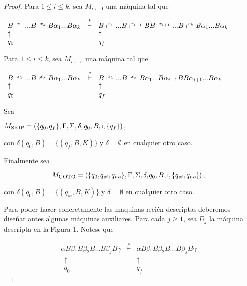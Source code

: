 \begin{lemma}
\begin{proof}
		\bigskip

    \noindent Para $1\leq i\leq k$, sea $M_{i\leftarrow 0}$ una máquina tal que

		\bigskip

    $\displaystyle \begin{array}{lcl} B\shortmid ^{x_{1}}...B\shortmid ^{x_{k}}B\alpha _{1}...B\alpha _{k} &
    \overset{\ast }{\vdash } & B\shortmid ^{x_{1}}...B\shortmid ^{x_{i-1}}BB\shortmid ^{x_{i+1}}...B\shortmid
    ^{x_{k}}B\alpha _{1}...B\alpha _{k} \\ \uparrow & & \uparrow \\ q_{0} & & q_{f} \end{array} $

		\bigskip

    \noindent Para $1\leq i\leq k$, sea $M_{i\leftarrow \varepsilon }$ una máquina tal que

		\bigskip

    $\displaystyle \begin{array}{lcl} B\shortmid ^{x_{1}}...B\shortmid ^{x_{k}}B\alpha _{1}...B\alpha _{k} &
    \overset{\ast }{\vdash } & B\shortmid ^{x_{1}}...B\shortmid
    ^{x_{k}}B\alpha _{1}...B\alpha _{i-1}BB\alpha _{i+1}...B\alpha _{k} \\
    \uparrow & & \uparrow \\ q_{0} & & q_{f} \end{array} $

		\bigskip

    \noindent Sea

    $\displaystyle M_{\mathrm{SKIP}}=\left( \{q_{0},q_{f}\},\Gamma ,\Sigma ,\delta ,q_{0},B,\shortmid ,\{q_{f}\}\right) ,$

		\noindent con $\delta (q_{0},B)=\{(q_{f},B,K)\}$ y $\delta =\emptyset $ en cualquier otro caso.

		\bigskip

    \noindent Finalmente sea

		\[
    \displaystyle M_{\mathrm{GOTO}}=\left( \{q_{0},q_{si},q_{no}\},\Gamma ,\Sigma ,\delta ,q_{0},B,\shortmid ,\{q_{si},q_{no}\}\right) ,
    \]

    \noindent con $\delta (q_{0},B)=\{(q_{si},B,K)\}$ y $\delta =\emptyset $ en cualquier otro caso.

		Para poder hacer concretamente las maquinas recién descriptas deberemos diseñar antes algunas máquinas auxiliares.
		Para cada $j\geq 1$, sea $D_{j}$ la máquina descripta en la Figura 1. Notese que

		\[
		\displaystyle \begin{array}{lcr} \alpha B\beta _{1}B\beta _{2}B...B\beta _{j}B\gamma & \overset{\ast }{\vdash } & \alpha B\beta _{1}B\beta _{2}B...B\beta _{j}B\gamma \\
    \ \ \uparrow & & \uparrow \ \ \\ \ \ q_{0} & & q_{f}\ \ \end{array}
		\]


\end{proof}
\end{lemma}
